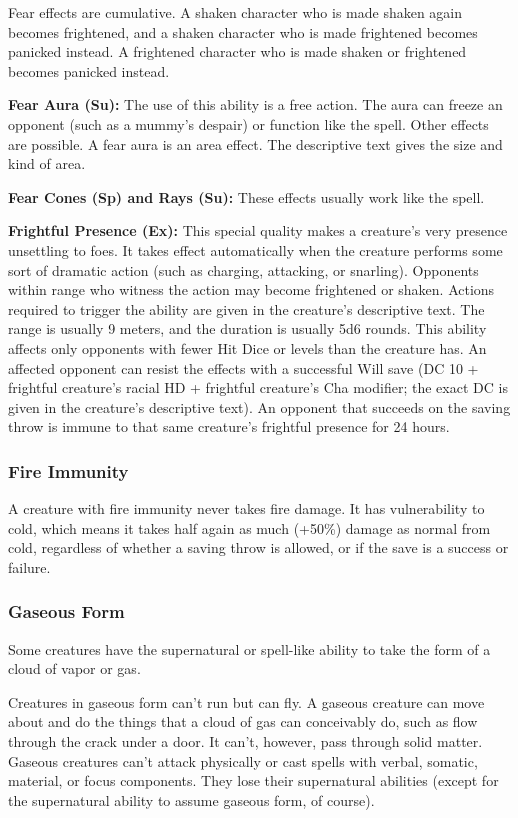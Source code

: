 Fear effects are cumulative. A shaken character who is made shaken again becomes frightened, and a shaken character who is made frightened becomes panicked instead. A frightened character who is made shaken or frightened becomes panicked instead.

\textbf{Fear Aura (Su):} The use of this ability is a free action. The aura can freeze an opponent (such as a mummy's despair) or function like the  spell. Other effects are possible. A fear aura is an area effect. The descriptive text gives the size and kind of area.

\textbf{Fear Cones (Sp) and Rays (Su):} These effects usually work like the  spell.

\textbf{Frightful Presence (Ex):} This special quality makes a creature's very presence unsettling to foes. It takes effect automatically when the creature performs some sort of dramatic action (such as charging, attacking, or snarling). Opponents within range who witness the action may become frightened or shaken. Actions required to trigger the ability are given in the creature's descriptive text. The range is usually 9 meters, and the duration is usually 5d6 rounds. This ability affects only opponents with fewer Hit Dice or levels than the creature has. An affected opponent can resist the effects with a successful Will save (DC 10 + \onehalf frightful creature's racial HD + frightful  creature's Cha modifier; the exact DC is given in the creature's descriptive text). An opponent that succeeds on the saving throw is immune to that same creature's frightful presence for 24 hours.

\subsubsection{Fire Immunity}
A creature with fire immunity never takes fire damage. It has vulnerability to cold, which means it takes half again as much (+50\%) damage as normal from cold, regardless of whether a saving throw is allowed, or if the save is a success or failure.

\subsubsection{Gaseous Form}
Some creatures have the supernatural or spell-like ability to take the form of a cloud of vapor or gas.

Creatures in gaseous form can't run but can fly. A gaseous creature can move about and do the things that a cloud of gas can conceivably do, such as flow through the crack under a door. It can't, however, pass through solid matter. Gaseous creatures can't attack physically or cast spells with verbal, somatic, material, or focus components. They lose their supernatural abilities (except for the supernatural ability to assume gaseous form, of course).


